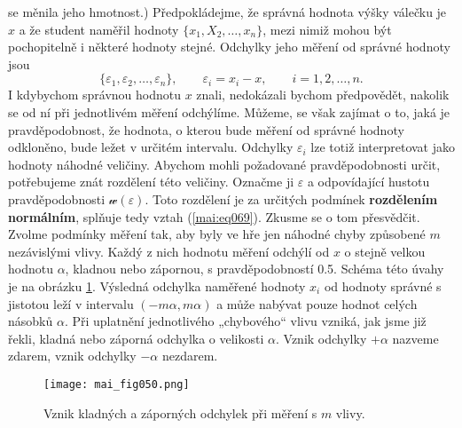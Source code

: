       se měnila jeho hmotnost.) Předpokládejme, že správná hodnota výšky válečku je \(x\) a že 
      student naměřil hodnoty \(\lbrace x_1, X_2, \ldots, x_n\rbrace\), mezi nimiž mohou být 
      pochopitelně i některé hodnoty stejné. Odchylky jeho měření od správné hodnoty jsou
      \begin{equation*}
        \lbrace \varepsilon_1, \varepsilon_2, \ldots, \varepsilon_n\rbrace, \qquad
        \varepsilon_i = x_i - x, \qquad i = 1, 2, \ldots, n.
      \end{equation*}
      I kdybychom správnou hodnotu \(x\) znali, nedokázali bychom předpovědět, nakolik se od ní při
      jednotlivém měření odchýlíme. Můžeme, se však zajímat o to, jaká je pravděpodobnost, že
      hodnota, o kterou bude měření od správné hodnoty odkloněno, bude ležet v určitém intervalu.
      Odchylky \(\varepsilon_i\) lze totiž interpretovat jako hodnoty náhodné veličiny. Abychom 
      mohli požadované pravděpodobnosti určit, potřebujeme znát rozdělení této veličiny. Označme ji 
      \(\varepsilon\) a odpovídající hustotu pravděpodobnosti \(\mathcal{w}(\varepsilon)\). Toto 
      rozdělení je za určitých podmínek \textbf{rozdělením normálním}, splňuje tedy vztah 
      (\ref{mai:eq069}). Zkusme se o tom přesvědčit. Zvolme podmínky měření tak, aby byly ve hře 
      jen náhodné chyby způsobené \(m\) nezávislými vlivy. Každý z nich hodnotu měření
      odchýlí od \(x\) o stejně velkou hodnotu \(\alpha\), kladnou nebo zápornou, s 
      pravděpodobností \num{0.5}. Schéma této úvahy je na obrázku \ref{mai:fig050}. Výsledná 
      odchylka naměřené hodnoty \(x_i\) od hodnoty správné s jistotou leží v intervalu \((-m\alpha, 
      m\alpha)\) a může nabývat pouze hodnot celých násobků \(\alpha\). Při uplatnění jednotlivého 
      „chybového“ vlivu vzniká, jak jsme již řekli, kladná nebo záporná odchylka o velikosti 
      \(\alpha\). Vznik odchylky \(+\alpha\) nazveme zdarem, vznik odchylky \(-\alpha\) nezdarem.
      
      \begin{figure}[ht!] %
        \centering
        \texttt{[image: mai\_fig050.png]}
        \caption{Vznik kladných a záporných odchylek při měření s \(m\) vlivy. 
        \cite[s.~255]{Musilova2009MA1}}
        \label{mai:fig050}
      \end{figure}
      
